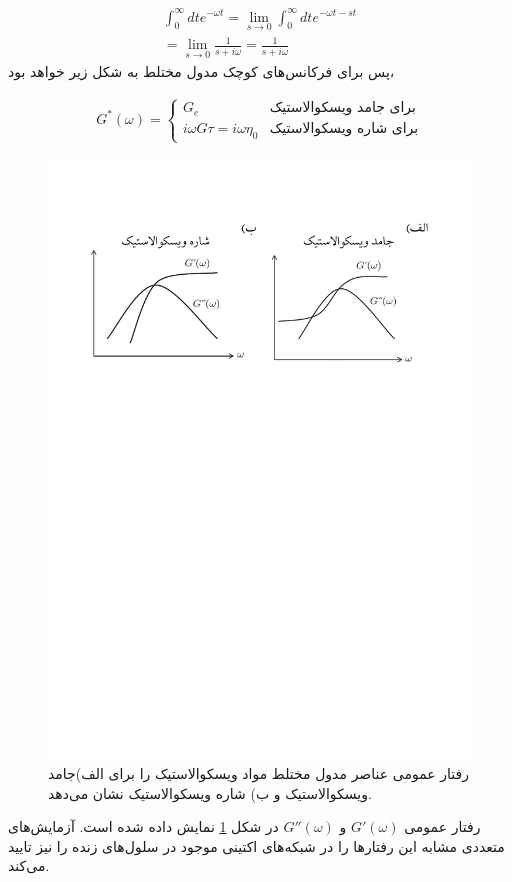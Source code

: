 \begin{equation}
\begin{aligned}
\int_0^\infty dte^{-\omega t}=\lim_{s\rightarrow0}\int_0^\infty dte^{-\omega t-st}\\
=\lim_{s\rightarrow0}\frac{1}{s+i\omega}=\frac{1}{s+i\omega}
\label{eq:saG}
\end{aligned}
\end{equation}
پس برای فرکانس‌های کوچک مدول مختلط به شکل زیر خواهد بود،

\begin{equation}
\begin{aligned}
G^*(\omega)=
  \begin{cases}
    G_e       & \text{برای جامد ویسکوالاستیک}\\
    i\omega G\tau=i\omega\eta_0       & \text{برای شاره ویسکوالاستیک}
  \end{cases}
\end{aligned}
\end{equation}

\begin{figure}[htbp]
\begin{center}
\includegraphics[width=5in]{Figs/9_4}
\caption{
رفتار عمومی عناصر مدول مختلط مواد ویسکوالاستیک را برای الف)جامد ویسکوالاستیک و ب) شاره ویسکوالاستیک نشان می‌دهد.
}
\label{fig:viscoSF}
\end{center}
\end{figure}
رفتار عمومی $G'(\omega)$ و $G''(\omega)$ در شکل \ref{fig:viscoSF} نمایش داده شده است. آزمایش‌‌های متعددی مشابه این رفتار‌ها را در شبکه‌های اکتینی موجود در سلول‌های زنده را نیز تایید می‌کند.





